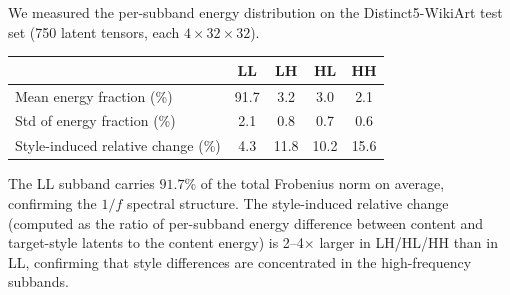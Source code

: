 \documentclass[letterpaper]{article}
\begin{document}
We measured the per-subband energy distribution on the Distinct5-WikiArt test set (750 latent tensors, each $4 \times 32 \times 32$).

\begin{center}
\begin{tabular}{lcccc}
\toprule
& LL & LH & HL & HH \\
\midrule
Mean energy fraction (\%) & 91.7 & 3.2 & 3.0 & 2.1 \\
Std of energy fraction (\%) & 2.1 & 0.8 & 0.7 & 0.6 \\
Style-induced relative change (\%) & 4.3 & 11.8 & 10.2 & 15.6 \\
\bottomrule
\end{tabular}
\end{center}

The LL subband carries $91.7\%$ of the total Frobenius norm on average, confirming the $1/f$ spectral structure. The style-induced relative change (computed as the ratio of per-subband energy difference between content and target-style latents to the content energy) is 2--4$\times$ larger in LH/HL/HH than in LL, confirming that style differences are concentrated in the high-frequency subbands.
\end{document}
